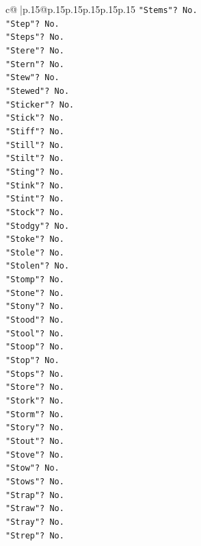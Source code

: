 \documentclass{article}
\begin{document}
{\begin{supertabular}{c@{$\;$}|p{.15\linewidth}@{}p{.15\linewidth}p{.15\linewidth}p{.15\linewidth}p{.15\linewidth}p{.15\linewidth}}
{{{\texttt{"Stems"? No.} \\
\texttt{"Step"? No.} \\
\texttt{"Steps"? No.} \\
\texttt{"Stere"? No.} \\
\texttt{"Stern"? No.} \\
\texttt{"Stew"? No.} \\
\texttt{"Stewed"? No.} \\
\texttt{"Sticker"? No.} \\
\texttt{"Stick"? No.} \\
\texttt{"Stiff"? No.} \\
\texttt{"Still"? No.} \\
\texttt{"Stilt"? No.} \\
\texttt{"Sting"? No.} \\
\texttt{"Stink"? No.} \\
\texttt{"Stint"? No.} \\
\texttt{"Stock"? No.} \\
\texttt{"Stodgy"? No.} \\
\texttt{"Stoke"? No.} \\
\texttt{"Stole"? No.} \\
\texttt{"Stolen"? No.} \\
\texttt{"Stomp"? No.} \\
\texttt{"Stone"? No.} \\
\texttt{"Stony"? No.} \\
\texttt{"Stood"? No.} \\
\texttt{"Stool"? No.} \\
\texttt{"Stoop"? No.} \\
\texttt{"Stop"? No.} \\
\texttt{"Stops"? No.} \\
\texttt{"Store"? No.} \\
\texttt{"Stork"? No.} \\
\texttt{"Storm"? No.} \\
\texttt{"Story"? No.} \\
\texttt{"Stout"? No.} \\
\texttt{"Stove"? No.} \\
\texttt{"Stow"? No.} \\
\texttt{"Stows"? No.} \\
\texttt{"Strap"? No.} \\
\texttt{"Straw"? No.} \\
\texttt{"Stray"? No.} \\
\texttt{"Strep"? No.} \\
}}}
\end{supertabular}}
\end{document}
